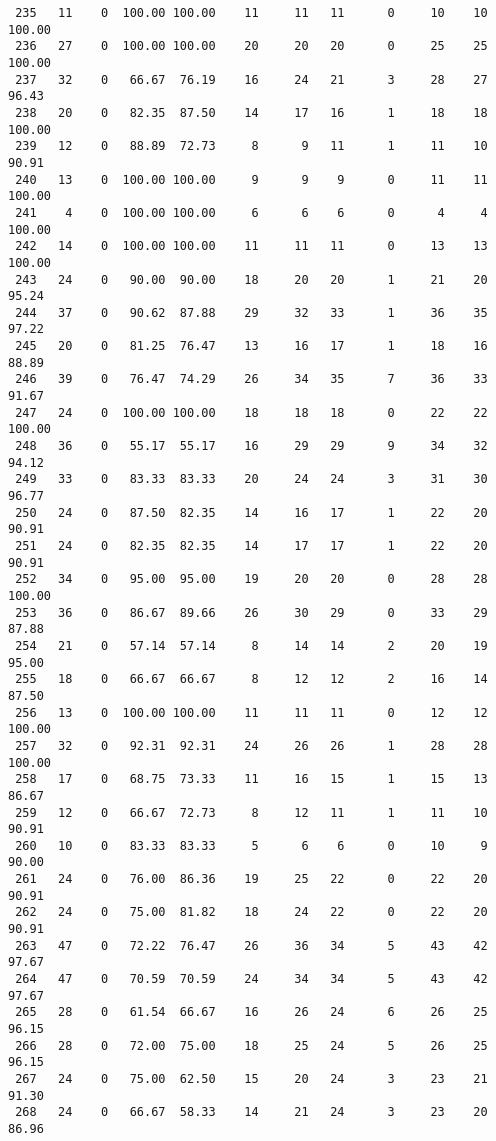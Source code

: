 \begin{verbatim}
 235   11    0  100.00 100.00    11     11   11      0     10    10   100.00
 236   27    0  100.00 100.00    20     20   20      0     25    25   100.00
 237   32    0   66.67  76.19    16     24   21      3     28    27    96.43
 238   20    0   82.35  87.50    14     17   16      1     18    18   100.00
 239   12    0   88.89  72.73     8      9   11      1     11    10    90.91
 240   13    0  100.00 100.00     9      9    9      0     11    11   100.00
 241    4    0  100.00 100.00     6      6    6      0      4     4   100.00
 242   14    0  100.00 100.00    11     11   11      0     13    13   100.00
 243   24    0   90.00  90.00    18     20   20      1     21    20    95.24
 244   37    0   90.62  87.88    29     32   33      1     36    35    97.22
 245   20    0   81.25  76.47    13     16   17      1     18    16    88.89
 246   39    0   76.47  74.29    26     34   35      7     36    33    91.67
 247   24    0  100.00 100.00    18     18   18      0     22    22   100.00
 248   36    0   55.17  55.17    16     29   29      9     34    32    94.12
 249   33    0   83.33  83.33    20     24   24      3     31    30    96.77
 250   24    0   87.50  82.35    14     16   17      1     22    20    90.91
 251   24    0   82.35  82.35    14     17   17      1     22    20    90.91
 252   34    0   95.00  95.00    19     20   20      0     28    28   100.00
 253   36    0   86.67  89.66    26     30   29      0     33    29    87.88
 254   21    0   57.14  57.14     8     14   14      2     20    19    95.00
 255   18    0   66.67  66.67     8     12   12      2     16    14    87.50
 256   13    0  100.00 100.00    11     11   11      0     12    12   100.00
 257   32    0   92.31  92.31    24     26   26      1     28    28   100.00
 258   17    0   68.75  73.33    11     16   15      1     15    13    86.67
 259   12    0   66.67  72.73     8     12   11      1     11    10    90.91
 260   10    0   83.33  83.33     5      6    6      0     10     9    90.00
 261   24    0   76.00  86.36    19     25   22      0     22    20    90.91
 262   24    0   75.00  81.82    18     24   22      0     22    20    90.91
 263   47    0   72.22  76.47    26     36   34      5     43    42    97.67
 264   47    0   70.59  70.59    24     34   34      5     43    42    97.67
 265   28    0   61.54  66.67    16     26   24      6     26    25    96.15
 266   28    0   72.00  75.00    18     25   24      5     26    25    96.15
 267   24    0   75.00  62.50    15     20   24      3     23    21    91.30
 268   24    0   66.67  58.33    14     21   24      3     23    20    86.96

\end{verbatim}
